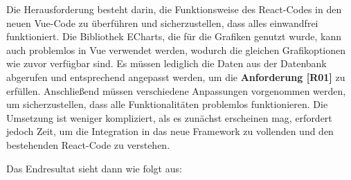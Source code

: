 Die Herausforderung besteht darin, die Funktionsweise des React-Codes in den neuen Vue-Code zu überführen und sicherzustellen, dass alles einwandfrei funktioniert. Die Bibliothek ECharts, die für die Grafiken genutzt wurde, kann auch problemlos in Vue verwendet werden, wodurch die gleichen Grafikoptionen wie zuvor verfügbar sind. Es müssen lediglich die Daten aus der Datenbank abgerufen und entsprechend angepasst werden, um die \textbf{Anforderung [R01]} zu erfüllen.
Anschließend müssen verschiedene Anpassungen vorgenommen werden, um sicherzustellen, dass alle Funktionalitäten problemlos funktionieren.
Die Umsetzung ist weniger kompliziert, als es zunächst erscheinen mag, erfordert jedoch Zeit, um die Integration in das neue Framework zu vollenden und den bestehenden React-Code zu verstehen.

Das Endresultat sieht dann wie folgt aus: %